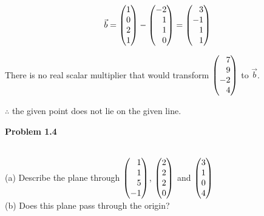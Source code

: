 \documentclass[12pt]{article}
\newenvironment{problem}[1][default]{
  \begin{framed}\begin{minipage}{0.97\textwidth}
  \setlength{\parskip}{4mm}
  {\bf Problem #1}
}{\end{minipage}\end{framed}}
\newcommand\m[2][]{
	\ifthenelse{\equal {#1} {}}
		{\begin{pmatrix*}[r]#2\end{pmatrix*}}
		{\left(\begin{array}{#1}#2\end{array}\right)}
}
\begin{document}
\begin{equation}
	\vec{b} = \m{1 \\ 0 \\ 2 \\ 1} - \m{-2 \\ 1 \\ 1 \\ 0} = \m{3 \\ -1 \\ 1 \\ 1}
\end{equation}

There is no real scalar multiplier that would transform $\m{7 \\ 9 \\ -2 \\ 4}$ to $\vec{b}$.

$\therefore$ the given point does not lie on the given line.

\begin{problem}[1.4]
	\\
	(a) Describe the plane through $\m{1 \\ 1 \\ 5 \\ -1}$, $\m{2 \\ 2 \\ 2 \\ 0}$ and $\m{3 \\ 1 \\ 0 \\ 4}$ \\
	(b) Does this plane pass through the origin?
\end{problem}[1.4]
\end{document}
